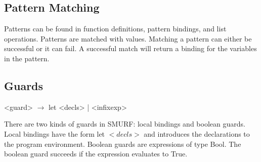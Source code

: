 \subsection{Pattern Matching}

Patterns can be found in function definitions, pattern bindings, and list operations. Patterns are matched with values. Matching a pattern can either be successful or it can fail. A successful match will return  a binding for the variables in the pattern. 

\subsection{Guards}
\begin{grammar}
<guard> $\rightarrow$  let <decls> | <infixexp>          
\end{grammar}

There are two kinds of guards in SMURF: local bindings and boolean guards. Local bindings have the form let $<decls>$ and introduces the declarations to the program environment. Boolean guards are expressions of type Bool. The boolean guard succeeds if the expression evaluates to True.

